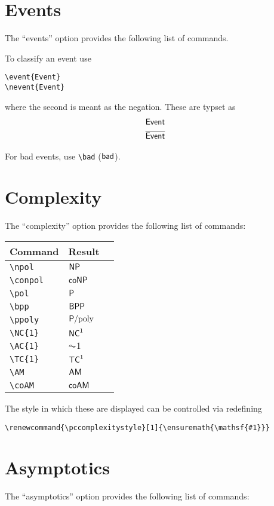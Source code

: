 \documentclass[a4paper]{report}
\begin{document}
\section{Events}
The \enquote{events} option provides the following list of commands. 

To classify an event use
\begin{lstlisting}
\event{Event}
\nevent{Event}
\end{lstlisting}
where the second is meant as the negation. These are typset as
\begin{align*}
&\mathsf{Event}\\
&\overline{\mathsf{Event}}
\end{align*}

For bad events, use \lstinline$\bad$ ($\mathsf{bad}$).

\section{Complexity}
The \enquote{complexity} option provides the following list of commands:

\begin{center}
\begin{tabular}{l l l}
\textbf{Command} & \textbf{Result} \\\hline
\lstinline$\npol$ &  $\npol$  \\
\lstinline$\conpol$ &  $\conpol$  \\
\lstinline$\pol$ &  $\pol$  \\
\lstinline$\bpp$ & $\bpp$  \\
\lstinline$\ppoly$ & $\ppoly$  \\
\lstinline$\NC{1}$ &  $\NC1$  \\
\lstinline$\AC{1}$ & $\AC1$  \\
\lstinline$\TC{1}$ & $\TC1$ \\
\lstinline$\AM$ &  $\AM$  \\
\lstinline$\coAM$ &  $\coAM$  
\end{tabular}
\end{center}

The style in which these are displayed can be controlled via redefining
\begin{lstlisting}
\renewcommand{\pccomplexitystyle}[1]{\ensuremath{\mathsf{#1}}}
\end{lstlisting}

\section{Asymptotics}
The \enquote{asymptotics} option provides the following list of commands:
\end{document}
